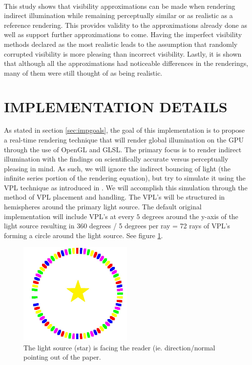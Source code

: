 \paragraph{}
This study shows that visibility approximations can be made when rendering indirect illumination while remaining perceptually similar or as realistic as a reference rendering.  This provides validity to the approximations already done as well as support further approximations to come.  Having the imperfect visibility methods declared as the most realistic leads to the assumption that randomly corrupted visibility is more pleasing than incorrect visibility.  Lastly, it is shown that although all the approximations had noticeable differences in the renderings, many of them were still thought of as being realistic.

\section{IMPLEMENTATION DETAILS} \label{sec:impdetails}
\paragraph{}
As stated in section \ref{sec:impgoals}, the goal of this implementation is to propose a real-time rendering technique that will render global illumination on the GPU through the use of OpenGL and GLSL.  The primary focus is to render indirect illumination with the findings on scientifically accurate versus perceptually pleasing in mind.  As such, we will ignore the indirect bouncing of light (the infinite series portion of the rendering equation), but try to simulate it using the VPL technique as introduced in \cite{Keller1997}.  We will accomplish this simulation through the method of VPL placement and handling.  The VPL's will be structured in hemispheres around the primary light source.  The default original implementation will include VPL's at every $5$ degrees around the y-axis of the light source resulting in 360 degrees / 5 degrees per ray = 72 rays of VPL's forming a circle around the light source. See figure \ref{fig:3.1}.

\begin{figure}[h!]
  \centering
    \includegraphics[width=0.5\textwidth]{Figure31.jpg}
  \caption{The light source (star) is facing the reader (ie. direction/normal pointing out of the paper.}
	\label{fig:3.1}
\end{figure}


